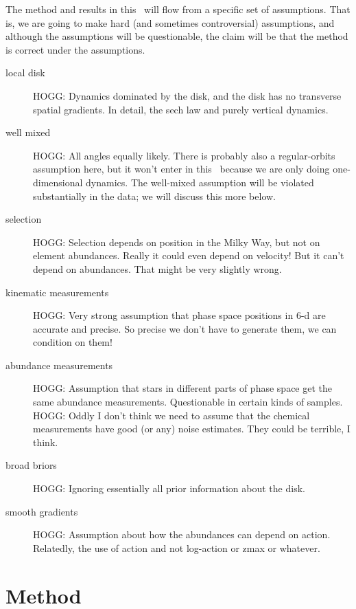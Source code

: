 \documentclass[modern]{aastex63}
\begin{document}
The method and results in this \documentname\ will flow from a specific set of
assumptions.
That is, we are going to make hard (and sometimes controversial) assumptions,
and although the assumptions will be questionable, the claim will be that the
method is correct under the assumptions.
\begin{description}
\item[local disk] HOGG: Dynamics dominated by the disk,
and the disk has no transverse spatial gradients. In detail, the sech law and purely
vertical dynamics.

\item[well mixed] HOGG: All angles equally likely. There is probably also a regular-orbits
assumption here, but it won't enter in this \documentname\ because we are only doing
one-dimensional dynamics. The well-mixed assumption will be violated substantially in the data;
we will discuss this more below.

\item[selection] HOGG: Selection depends on position in the Milky Way, but not
on element abundances. Really it could even depend on velocity! But it can't depend
on abundances. That might be very slightly wrong.

\item[kinematic measurements] HOGG: Very strong assumption that phase space positions
in 6-d are accurate and precise. So precise we don't have to generate them, we can
condition on them!

\item[abundance measurements] HOGG: Assumption that stars in different parts of phase
space get the same abundance measurements. Questionable in certain kinds of samples.
HOGG: Oddly I don't think we need to assume that the chemical measurements have good
(or any) noise estimates. They could be terrible, I think.

\item[broad briors] HOGG: Ignoring essentially all prior information about the disk.

\item[smooth gradients] HOGG: Assumption about how the abundances can depend on action.
Relatedly, the use of action and not log-action or zmax or whatever.
\end{description}

\section{Method}
\end{document}
